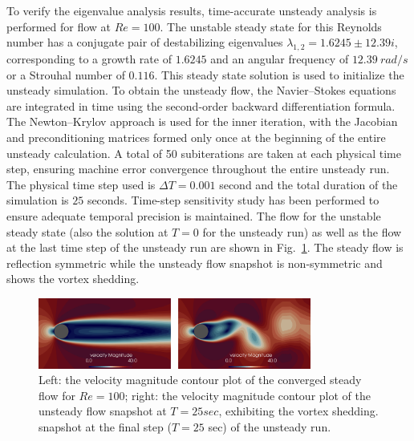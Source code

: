 \documentclass[journal,final]{new-aiaa}
\begin{document}
To verify the eigenvalue analysis results, time-accurate
unsteady analysis is performed for flow at $Re=100$.
The unstable steady state for this Reynolds number has a
conjugate pair of destabilizing
eigenvalues $\lambda_{1,2}=1.6245\pm12.39i$, corresponding to a
growth rate of $1.6245$ and an angular frequency of $12.39~rad/s$
or a Strouhal number of $0.116$. This steady state solution is
used to initialize the unsteady simulation. To obtain the unsteady
flow, the Navier--Stokes equations are integrated in time using the second-order backward differentiation formula. The Newton--Krylov
approach is used for the inner iteration, with the Jacobian and preconditioning matrices formed only once at the beginning of the
entire unsteady calculation. A total of 50 subiterations are taken
at each physical time step, ensuring machine error convergence
throughout the entire unsteady run. The physical time step used
is $\Delta T=0.001$ second and the total duration of
the simulation is $25$ seconds. Time-step sensitivity study has been
performed to ensure adequate temporal precision is maintained.
The flow for the unstable steady state (also the solution at $T=0$
for the unsteady run) as well as the flow at the last time step
of the unsteady run are shown in Fig.~\ref{fig:cyl-re100-std-uns}.
The steady flow is reflection symmetric while the unsteady flow
snapshot is non-symmetric and shows the vortex shedding.
\begin{figure}[htb]
	\centering   
	\includegraphics[width=0.8\textwidth]{cyl-flow.png}
	\caption{Left: the velocity magnitude contour plot of the
		converged steady flow for $Re=100$; right:
		the velocity magnitude contour plot of the unsteady
		flow snapshot at $T=25 sec$, exhibiting the
		vortex shedding.
		snapshot at the final step ($T=25$ sec) of
		the unsteady run.}
	\label{fig:cyl-re100-std-uns}
\end{figure}
\end{document}
